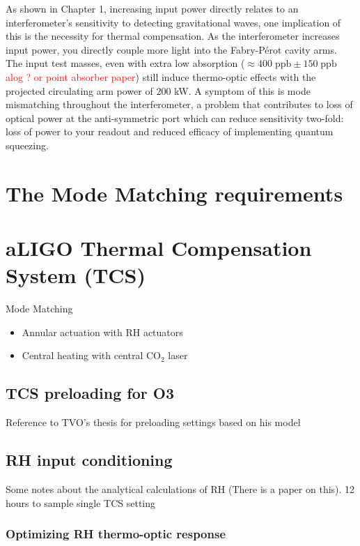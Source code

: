 


As shown in Chapter 1,  increasing input power directly relates to an interferometer's sensitivity to detecting gravitational waves, one implication of this is the necessity for thermal compensation. As the interferometer increases input power, you directly couple more light into the Fabry-P\'{e}rot cavity arms. The input test masses, even with extra low absorption ($\approx 400 \; \mathrm{ppb} \pm 150 \; \mathrm{ppb}$ \textcolor{red}{alog ? or point absorber paper}) still induce thermo-optic effects with the projected circulating arm power of 200 kW. A symptom of this is mode mismatching throughout the interferometer, a problem that contributes to loss of optical power at the anti-symmetric port which can reduce sensitivity two-fold: loss of power to your readout and reduced efficacy of implementing quantum squeezing.

\section{The Mode Matching requirements}


\section{aLIGO Thermal Compensation System (TCS)}
Mode Matching
\begin{itemize}
\item Annular actuation with RH actuators
\item Central heating with central $\mathrm{CO}_2$ laser
\end{itemize} 

\subsection{TCS preloading for O3}
Reference to TVO's thesis for preloading settings based on his model \cite{tvo}


\subsection{RH input conditioning}
Some notes about the analytical calculations of RH (There is a paper on this).
12 hours to sample single TCS setting
\subsubsection{Optimizing RH thermo-optic response}

